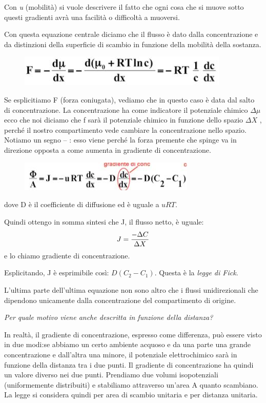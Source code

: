 \documentclass[a4paper,12pt]{article}
\begin{document}
Con \emph{u} (mobilità) si vuole descrivere il fatto che ogni cosa che si muove sotto questi gradienti avrà una facilità o difficoltà a muoversi.

Con questa equazione centrale diciamo che il flusso è dato dalla concentrazione e da distinzioni della superficie di scambio in funzione della mobilità della sostanza.
\begin{figure}[H]
\centering
\includegraphics[scale=0.55]{immagine/F.jpg}
\caption{}
\end{figure}

Se esplicitiamo F (forza coniugata), vediamo che in questo caso è data dal salto di concentrazione.
La concentrazione ha come indicatore il potenziale chimico $\Delta \mu$ ecco che noi diciamo che f sarà il potenziale chimico in funzione dello spazio $\Delta X$ , perché il nostro compartimento vede cambiare la concentrazione nello spazio.
Notiamo un segno – : esso viene perché la forza premente che spinge va in direzione opposta a come aumenta in gradiente di concentrazione.
\begin{figure}[H]
\centering
\includegraphics[scale=0.4]{immagine/fi.jpg}
\caption{}
\end{figure}

dove D è il coefficiente di diffusione ed è uguale a $uRT$.

Quindi ottengo in somma sintesi che J, il flusso netto, è uguale:
\begin{equation}
\centering
J=\frac{- \Delta C}{\Delta X} 
\end{equation} 
e lo chiamo gradiente di concentrazione.

Esplicitando, J è esprimibile così: $ D (C_{2}-C_{1})$. Questa è la \emph{legge di Fick}.

L'ultima parte dell'ultima equazione non sono altro che i flussi unidirezionali che dipendono unicamente dalla concentrazione del compartimento di origine.

\emph{Per quale motivo viene anche descritta in funzione della distanza?}

In realtà, il gradiente di concentrazione, espresso come differenza, può essere visto in due modi:se abbiamo un certo ambiente acquoso e da una parte una grande concentrazione e dall'altra una minore, il potenziale elettrochimico sarà in funzione della distanza tra i due punti. Il gradiente di concentrazione ha quindi un valore diverso nei due punti. Prendiamo due volumi isopotenziali (uniformemente distribuiti) e stabiliamo attraverso un'area A quanto scambiano. La legge si considera quindi per area di scambio unitaria e per distanza unitaria.
\end{document}
